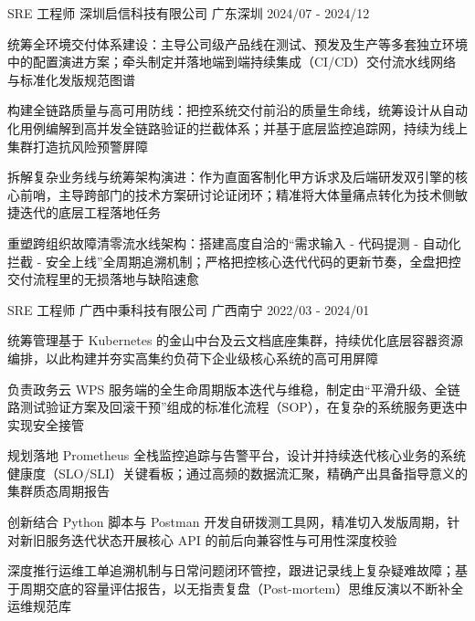

\begin{cventries}

  \cventry
    {SRE 工程师} %
    {深圳启信科技有限公司} %
    {广东深圳} %
    {2024/07 - 2024/12} %
    {
      \begin{cvitems} %
        \item {统筹全环境交付体系建设：主导公司级产品线在测试、预发及生产等多套独立环境中的配置演进方案；牵头制定并落地端到端持续集成（CI/CD）交付流水线网络与标准化发版规范图谱}
        \item {构建全链路质量与高可用防线：把控系统交付前沿的质量生命线，统筹设计从自动化用例编解到高并发全链路验证的拦截体系；并基于底层监控追踪网，持续为线上集群打造抗风险预警屏障}
        \item {拆解复杂业务线与统筹架构演进：作为直面客制化甲方诉求及后端研发双引擎的核心前哨，主导跨部门的技术方案研讨论证闭环；精准将大体量痛点转化为技术侧敏捷迭代的底层工程落地任务}
        \item {重塑跨组织故障清零流水线架构：搭建高度自洽的“需求输入 - 代码提测 - 自动化拦截 - 安全上线”全周期追溯机制；严格把控核心迭代代码的更新节奏，全盘把控交付流程里的无损落地与缺陷速愈}
      \end{cvitems}
    }

  \cventry
    {SRE 工程师} %
    {广西中秉科技有限公司} %
    {广西南宁} %
    {2022/03 - 2024/01} %
    {
      \begin{cvitems} %
        \item {统筹管理基于 Kubernetes 的金山中台及云文档底座集群，持续优化底层容器资源编排，以此构建并夯实高集约负荷下企业级核心系统的高可用屏障}
        \item {负责政务云 WPS 服务端的全生命周期版本迭代与维稳，制定由“平滑升级、全链路测试验证方案及回滚干预”组成的标准化流程（SOP），在复杂的系统服务更迭中实现安全接管}
        \item {规划落地 Prometheus 全栈监控追踪与告警平台，设计并持续迭代核心业务的系统健康度（SLO/SLI）关键看板；通过高频的数据流汇聚，精确产出具备指导意义的集群质态周期报告}
        \item {创新结合 Python 脚本与 Postman 开发自研拨测工具网，精准切入发版周期，针对新旧服务迭代状态开展核心 API 的前后向兼容性与可用性深度校验}
        \item {深度推行运维工单追溯机制与日常问题闭环管控，跟进记录线上复杂疑难故障；基于周期交底的容量评估报告，以无指责复盘（Post-mortem）思维反演以不断补全运维规范库}
      \end{cvitems}
    }


\end{cventries}
